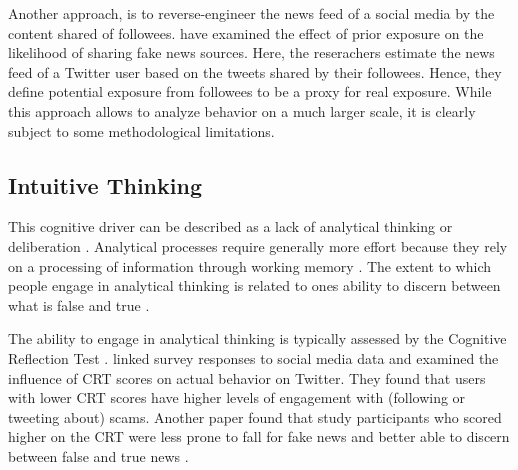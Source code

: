 \documentclass[
10pt, %
a4paper, %
oneside, %
headinclude,footinclude, %
] {book}%
\begin{document}
Another approach, is to reverse-engineer the news feed of a social media by the content shared of followees. \cite{grinberg2019partisanship} have examined the effect of prior exposure on the likelihood of sharing fake news sources. Here, the reserachers estimate the news feed of a Twitter user based on the tweets shared by their followees. Hence, they define potential exposure from followees to be a proxy for real exposure.
While this approach allows to analyze behavior on a much larger scale, it is clearly subject to some methodological limitations.



\subsection{Intuitive Thinking}



This cognitive driver can be described as a lack of analytical thinking or deliberation \citep{psychological_drivers_misinformation}. Analytical processes require generally more effort because they rely on a processing of information through working memory \citep{evans2013dual}. The extent to which people engage in analytical thinking is related to ones ability to discern between what is false and true  \citep{PENNYCOOK201939}. 

The ability to engage in analytical thinking is typically assessed by the Cognitive Reflection Test \citep{frederick2005cognitive}. \cite{mosleh2021cognitive} linked survey responses to social media data and examined the influence of CRT scores on actual behavior on Twitter. They found that users with lower CRT scores have higher levels of engagement with (following or tweeting about) scams. Another paper found that study participants who scored higher on the CRT were less prone to fall for fake news and better able to discern between false and true news \citep{PENNYCOOK_susceptibility}. 

\end{document}
